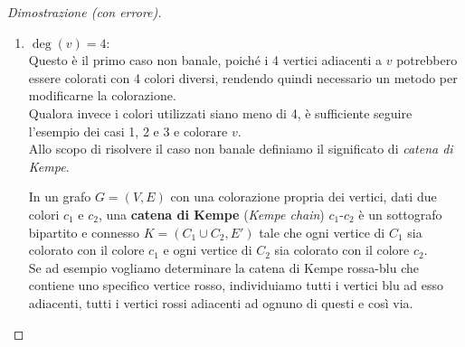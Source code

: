 \documentclass[a4paper,12pt,titlepage]{report}
\begin{document}
\begin{proof}[Dimostrazione (con errore)]
\begin{enumerate}
\begin{figure}[H]
        		\vspace{0.5cm}
        		\caption{$\deg(v) = 3$: i nodi B, R e G, adiacenti a $v$, sono colorati di blu, rosso e giallo, quindi $v$ può essere colorato di verde.}
        	\end{figure}
        	\item $\deg(v) = 4$:
        	\\Questo è il primo caso non banale, poiché i 4 vertici adiacenti a $v$ potrebbero essere colorati con 4 colori diversi, rendendo quindi necessario un metodo per modificarne la colorazione.
        	\\Qualora invece i colori utilizzati siano meno di 4, è sufficiente seguire l'esempio dei casi 1, 2 e 3 e colorare $v$.
        	\\Allo scopo di risolvere il caso non banale definiamo il significato di \emph{catena di Kempe}.
        	\begin{dfn}
        		In un grafo $G = (V, E)$ con una colorazione propria dei vertici, dati due colori $c_1$ e $c_2$, una {\bfseries catena di Kempe} (\emph{Kempe chain}) $c_1$-$c_2$ è un sottografo bipartito e connesso $K = (C_1 \cup C_2, E')$ tale che ogni vertice di $C_1$ sia colorato con il colore $c_1$ e ogni vertice di $C_2$ sia colorato con il colore $c_2$.
        		\\Se ad esempio vogliamo determinare la catena di Kempe rossa-blu che contiene uno specifico vertice rosso, individuiamo tutti i vertici blu ad esso adiacenti, tutti i vertici rossi adiacenti ad ognuno di questi e così via.
        	\end{dfn}
        	\begin{figure}[h]
        		\centering
\end{figure}
\end{enumerate}
\end{proof}
\end{document}
